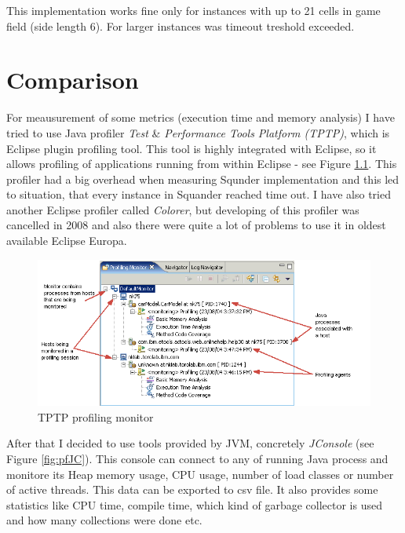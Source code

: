 \documentclass[11pt,twoside,a4paper]{book}
\begin{document}
This implementation works fine only for instances with up to 21 cells in game
field (side length 6). For larger instances was timeout treshold exceeded.
\newpage



\chapter{Comparison}
For meausurement of some metrics (execution time and memory analysis) I have
tried to use Java profiler \textit{Test} \& \textit{Performance Tools Platform
(TPTP)}, which is Eclipse plugin profiling tool. This tool is highly integrated with Eclipse, so
it allows profiling of applications running from within Eclipse - see Figure
\ref{fig:pfMonitor}. This profiler had a big overhead when measuring Squnder
implementation and this led to situation, that every instance in Squander
reached time out. I have also tried another Eclipse profiler called
\textit{Colorer}, but developing of this profiler was cancelled in 2008 and also
there were quite a lot of problems to use it in oldest available Eclipse Europa.


\begin{figure}[ht]
\begin{center}
\includegraphics[width=14cm]{figures/pf}
\caption{TPTP profiling monitor}
\label{fig:pfMonitor}
\end{center}
\end{figure}

After that I decided to use tools provided by JVM, concretely \textit{JConsole}
(see Figure \ref{fig:pfJC}). This console can connect to any of running Java
process and monitore its Heap memory usage, CPU usage, number of load classes or
number of active threads. This data can be exported to csv file. It also
provides some statistics like CPU time, compile time, which kind of garbage
collector is used and how many collections were done etc.
\end{document}
